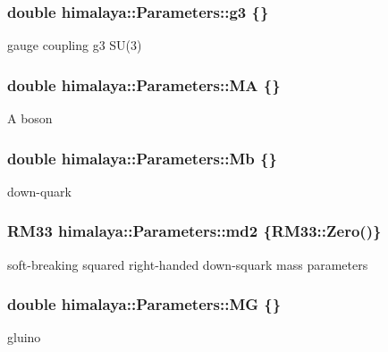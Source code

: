 \subsubsection[{\texorpdfstring{g3}{g3}}]{\setlength{\rightskip}{0pt plus 5cm}double himalaya\+::\+Parameters\+::g3 \{\}}\hypertarget{structhimalaya_1_1Parameters_a728fe0a5f7e390f3f165fbc536002296}{}\label{structhimalaya_1_1Parameters_a728fe0a5f7e390f3f165fbc536002296}
gauge coupling g3 S\+U(3) 
\subsubsection[{\texorpdfstring{MA}{MA}}]{\setlength{\rightskip}{0pt plus 5cm}double himalaya\+::\+Parameters\+::\+MA \{\}}\hypertarget{structhimalaya_1_1Parameters_a8cd4adb5c71cd896e95f4e4873e1a125}{}\label{structhimalaya_1_1Parameters_a8cd4adb5c71cd896e95f4e4873e1a125}
A boson 
\subsubsection[{\texorpdfstring{Mb}{Mb}}]{\setlength{\rightskip}{0pt plus 5cm}double himalaya\+::\+Parameters\+::\+Mb \{\}}\hypertarget{structhimalaya_1_1Parameters_aa2e33485d4234974d0a93af49ea5df7d}{}\label{structhimalaya_1_1Parameters_aa2e33485d4234974d0a93af49ea5df7d}
down-\/quark 
\subsubsection[{\texorpdfstring{md2}{md2}}]{\setlength{\rightskip}{0pt plus 5cm}R\+M33 himalaya\+::\+Parameters\+::md2 \{R\+M33\+::\+Zero()\}}\hypertarget{structhimalaya_1_1Parameters_a816c90360f6140e1f9c147efcdbe7ac2}{}\label{structhimalaya_1_1Parameters_a816c90360f6140e1f9c147efcdbe7ac2}
soft-\/breaking squared right-\/handed down-\/squark mass parameters 
\subsubsection[{\texorpdfstring{MG}{MG}}]{\setlength{\rightskip}{0pt plus 5cm}double himalaya\+::\+Parameters\+::\+MG \{\}}\hypertarget{structhimalaya_1_1Parameters_a3d42cda935b85168742dcd960d667501}{}\label{structhimalaya_1_1Parameters_a3d42cda935b85168742dcd960d667501}
gluino 
